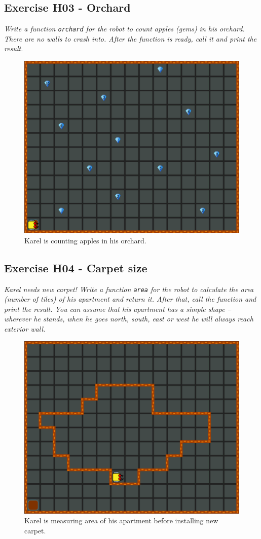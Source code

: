 \documentclass[article,A4,12pt]{llncs}
\begin{document}
{{{{\subsection{Exercise H03 - Orchard}

{\em Write a function {\tt orchard} for the robot to count apples (gems) in his orchard. There are no walls
to crash into. After the function is ready, call it and print the result.}

\begin{figure}[!ht]
\begin{center}
\includegraphics[height=0.4\textwidth]{img/h03.png}
\end{center}
\vspace{-4mm}
\caption{Karel is counting apples in his orchard.}
\label{fig:h03}
\vspace{-4mm}
\end{figure}
\noindent

\subsection{Exercise H04 - Carpet size}

{\em Karel needs new carpet! Write a function {\tt area} for the robot to calculate 
the area (number of tiles) of his apartment and return it. After that, call the function 
and print the result. You can assume that his apartment has a simple shape -- wherever 
he stands, when he goes north, south, east or west he will always reach exterior wall.}

\begin{figure}[!ht]
\begin{center}
\includegraphics[height=0.4\textwidth]{img/h04.png}
\end{center}
\vspace{-4mm}
\caption{Karel is measuring area of his apartment before installing new carpet.}
\label{fig:h04}
\vspace{-4mm}
\end{figure}
\noindent

}}}}
\end{document}
